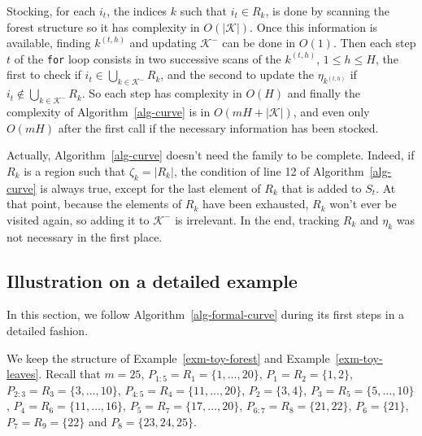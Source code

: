 \documentclass[
  11pt,
  a4paper,
]{article}
\theoremstyle{definition}
\theoremstyle{plain}
\theoremstyle{plain}
\theoremstyle{plain}
\theoremstyle{definition}
\theoremstyle{remark}
\newcounter{quartocallouttipno}
\newcommand{\quartocallouttip}[1]{\refstepcounter{quartocallouttipno}\label{#1}}
\begin{document}
Stocking, for each \(i_t\), the indices \(k\) such that \(i_t\in R_k\),
is done by scanning the forest structure so it has complexity in
\(O(|\mathcal{K}|)\). Once this information is available, finding
\(k^{(t,h)}\) and updating \(\mathcal{K}^-\) can be done in \(O(1)\).
Then each step \(t\) of the \texttt{for} loop consists in two successive
scans of the \(k^{(t,h)}\), \(1\leq h\leq H\), the first to check if
\(i_t\in\bigcup_{k\in\mathcal{K}^-}R_k\), and the second to update the
\(\eta_{k^{(t,h)}}\) if \(i_t\not\in\bigcup_{k\in\mathcal{K}^-}R_k\). So
each step has complexity in \(O(H)\) and finally the complexity of
 Algorithm~\ref{alg-curve}  is in \(O(mH+|\mathcal{K}|)\), and even only
\(O(mH)\) after the first call if the necessary information has been
stocked.

\begin{tcolorbox}[enhanced jigsaw, colframe=quarto-callout-tip-color-frame, coltitle=black, bottomtitle=1mm, breakable, colbacktitle=quarto-callout-tip-color!10!white, title=\textcolor{quarto-callout-tip-color}{\faLightbulb}\hspace{0.5em}{Tip \ref*{tip-no-complete} }, toprule=.15mm, opacitybacktitle=0.6, bottomrule=.15mm, leftrule=.75mm, colback=white, toptitle=1mm, opacityback=0, left=2mm, arc=.35mm, rightrule=.15mm, titlerule=0mm]

\quartocallouttip{tip-no-complete} 

Actually,  Algorithm~\ref{alg-curve}  doesn't need the family to be
complete. Indeed, if \(R_k\) is a region such that \(\zeta_k=|R_k|\),
the condition of line 12 of  Algorithm~\ref{alg-curve}  is always true,
except for the last element of \(R_k\) that is added to \(S_t\). At that
point, because the elements of \(R_k\) have been exhausted, \(R_k\)
won't ever be visited again, so adding it to \(\mathcal{K}^-\) is
irrelevant. In the end, tracking \(R_k\) and \(\eta_k\) was not
necessary in the first place.

\end{tcolorbox}

\subsection{Illustration on a detailed example}\label{sec-example}

In this section, we follow  Algorithm~\ref{alg-formal-curve}  during its
first steps in a detailed fashion.

We keep the structure of Example~\ref{exm-toy-forest} and
Example~\ref{exm-toy-leaves}. Recall that \(m=25\),
\(P_{1:5}=R_1 = \{1, \dotsc , 20 \}\), \(P_1=R_2  =  \{1, 2  \}\),
\(P_{2:3}=R_3   =   \{3 , \dotsc , 10 \}\),
\(P_{4:5}=R_4  =    \{11, \dotsc , 20 \}\), \(P_2=\{3,4\}\),
\(P_3=R_5 =  \{5, \dotsc , 10 \}\),
\(P_4=R_6   =     \{11, \dotsc , 16 \}\),
\(P_5=R_7  =   \{17, \dotsc ,20  \}\), \(P_{6:7}=R_8=\{21,22\}\),
\(P_6=\{21\}\), \(P_7=R_9 = \{22\}\) and \(P_8=\{23,24,25\}\).
\end{document}
